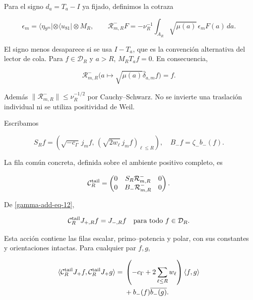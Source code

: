 Para el signo \(d_a=T_a-I\) ya fijado, definimos la cotraza

\begin{equation}
\epsilon_m=\langle\eta_{9^m}|\otimes\langle u_{81}|\otimes M_R,
\qquad
\mathcal R^-_{m,R}F
=-\nu_R^{-1}\int_{A_R}\sqrt{\mu(a)}\,\epsilon_m F(a)\,da.
\label{gamma-add-eq-11}
\end{equation}

El signo menos desaparece si se usa \(I-T_a\), que es la convención alternativa del lector de cola. Para \(f\in\mathcal D_R\) y \(a>R\), \(M_RT_af=0\). En consecuencia,

\begin{equation}
\mathcal R^-_{m,R}
\bigl(a\mapsto\sqrt{\mu(a)}\widehat\delta_{a,m}f\bigr)=f.
\label{gamma-add-eq-12}
\end{equation}
\label{gamma-add:cola-lector}

Además \(\|\mathcal R^-_{m,R}\|\le\nu_R^{-1/2}\) por Cauchy--Schwarz. No se invierte una traslación individual ni se utiliza positividad de Weil.

Escribamos

\begin{equation}
S_Rf=\left(\sqrt{-c_\Gamma}\,j_mf,\,
              (\sqrt{2w_\ell}\,j_mf)_{\ell\le R}\right),
\quad B_-f=\zeta_-b_-(f).
\label{gamma-add-display-28}
\end{equation}

La fila común concreta, definida sobre el ambiente positivo completo, es

\begin{equation}
\mathcal C_R^{\rm tail}
=
\begin{pmatrix}
0&S_R\mathcal R^-_{m,R}&0\\
0&B_-\mathcal R^-_{m,R}&0
\end{pmatrix}.
\label{gamma-add-eq-13}
\end{equation}

De \eqref{gamma-add-eq-12},

\begin{equation}
\mathcal C_R^{\rm tail}J_{+,R}f=J_{-,R}f
\quad\hbox{para todo }f\in\mathcal D_R.
\label{gamma-add-eq-14}
\end{equation}

Esta acción contiene las filas escalar, primo--potencia y polar, con sus constantes y orientaciones intactas. Para cualquier par \(f,g\),

\begin{equation}
\begin{aligned}
\langle\mathcal C_R^{\rm tail}J_+f,\mathcal C_R^{\rm tail}J_+g\rangle
={}&\left(-c_\Gamma+2\sum_{\ell\le R}w_\ell\right)\langle f,g\rangle\\
&+b_-(f)\overline{b_-(g)}.
\end{aligned}
\label{gamma-add-eq-15}
\end{equation}

